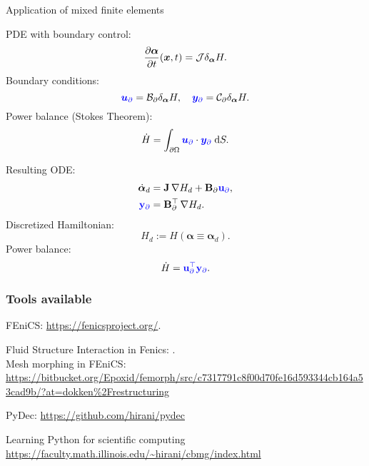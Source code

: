 \documentclass{beamer}
\begin{document}
\begin{frame}{Application of mixed finite elements}
		\begin{tcolorbox}[width=0.9\textwidth, nobeforeafter, colframe=theme,title=Infinite-dimensional pH system]%
			PDE with boundary control:
			\begin{equation*}
				\diffp{\bm{\alpha}}{t}(\bm{x}, t) = \mathcal{J} \delta_{\bm{\alpha}} H.
			\end{equation*}
			Boundary conditions: 
			\[\textcolor{blue}{\bm{u}_\partial} = \mathcal{B}_\partial \delta_{\bm{\alpha}} H, \quad \textcolor{blue}{\bm{y}_\partial} = \mathcal{C}_\partial \delta_{\bm{\alpha}} H. \]
			Power balance (Stokes Theorem): 
			\[ \dot{H} = \displaystyle \int_{\partial \Omega} \textcolor{blue}{\bm{u}_\partial} \cdot \textcolor{blue}{\bm{y}_\partial} \d{S}.
			\]
		\end{tcolorbox} 
		\begin{tcolorbox}[width=0.9\textwidth, nobeforeafter,  colframe=theme,title=Structure-preserving discretization]%
			Resulting ODE:
			\begin{align*}
				\dot{\bm{\alpha}}_d &= \mathbf{J} \, {\nabla {H}_d} + \mathbf{B}_\partial \textcolor{blue}{\mathbf{u}_\partial}, \\
				\textcolor{blue}{\mathbf{y}_\partial} &= \mathbf{B}_\partial^\top \,{\nabla {H}_d}.
			\end{align*}
			Discretized Hamiltonian:
			\[
			H_d := H(\bm{\alpha} \equiv \bm{\alpha}_d).
			\]
			Power balance: 
			\[ \dot{H} = \textcolor{blue}{\mathbf{u}_\partial^\top \mathbf{y}_\partial}.
			\]
		\end{tcolorbox}
\end{frame}


\begin{frame}\frametitle{Tools available}
FEniCS: \url{https://fenicsproject.org/}. \\
\vspace{.1cm}

Fluid Structure Interaction in Fenics: \cite{bergersen2020fenics}. \\
\vspace{.1cm}
Mesh morphing in FEniCS: \url{https://bitbucket.org/Epoxid/femorph/src/c7317791c8f00d70fe16d593344cb164a53cad9b/?at=dokken\%2Frestructuring} \\
\vspace{.1cm}	

PyDec: \url{https://github.com/hirani/pydec} \\
\vspace{.1cm}

Learning Python for scientific computing \url{https://faculty.math.illinois.edu/~hirani/cbmg/index.html}
\end{frame}
\end{document}
